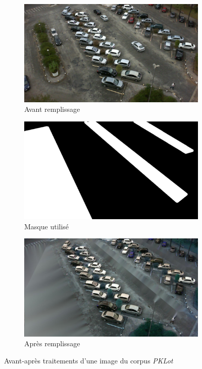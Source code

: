 \begin{figure}[ht]
    
    \begin{subfigure}{\textwidth}
        \centering
        \includegraphics[width=.6\linewidth]{img/realisation/fill_before.jpg}
        \caption{Avant remplissage}
    \end{subfigure}%

    \bigskip
    \begin{subfigure}{\textwidth}
        \centering
        \includegraphics[width=.6\linewidth]{img/realisation/fill_mask.png}
        \caption{Masque utilisé}
    \end{subfigure}

    \bigskip
    \begin{subfigure}{\textwidth}
        \centering
        \includegraphics[width=.6\linewidth]{img/realisation/fill_after.jpg}
        \caption{Après remplissage}
    \end{subfigure}

    \caption{Avant-après traitements d'une image du corpus \textit{PKLot}}
    \centering
    \label{fig:image_fill_compare}
\end{figure}

